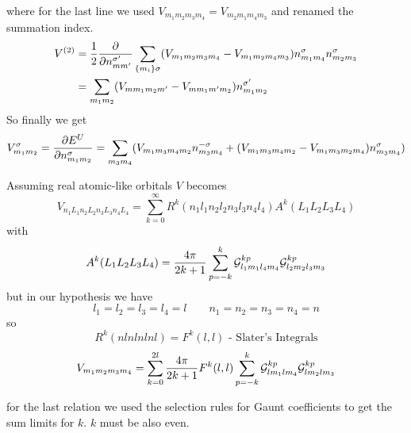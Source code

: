 where for the last line we used $V_{m_1m_2m_3m_4}=V_{m_2m_1m_4m_3}$ and renamed the summation index.\\
\begin{equation}
\begin{split}
V^{(2)}&=\frac{1}{2}\frac{\partial }{\partial n_{mm^\prime}^{\sigma^\prime}}\sum_{\{m_i\}\sigma}(V_{m_1m_2m_3m_4}-V_{m_1m_2m_4m_3})
n_{m_1m_4}^{\sigma}n_{m_2m_3}^{\sigma}\\
&=\sum_{m_1m_2}(V_{mm_1m_2m^{\prime}}-V_{mm_1m^{\prime}m_2})n_{m_1m_2}^{\sigma^\prime}
\end{split}
\end{equation}
So finally we get
\begin{equation}
V_{m_1m_2}^{\sigma}=\frac{\partial E^U}{\partial n_{m_1m_2}^{\sigma}}=\sum_{m_3m_4}(V_{m_1m_3m_4m_2}
n_{m_3m_4}^{-\sigma}+(V_{m_1m_3m_4m_2}-V_{m_1m_3m_2m_4})n_{m_3m_4}^{\sigma})
\end{equation}
%
\par{Assuming real atomic-like orbitals $V$ becomes}
\begin{equation}
V_{n_1L_1n_2L_2n_3L_3n_4L_4}=\sum_{k=0}^{\infty}R^k(n_1l_1n_2l_2n_3l_3n_4l_4)A^k(L_1L_2L_3L_4)
\end{equation}
with
\begin{equation*}
A^k(L_1L_2L_3L_4)=\frac{4\pi}{2k+1}\sum_{p=-k}^{k}\mathcal{G}_{l_1m_1l_4m_4}^{kp}\mathcal{G}_{l_2m_2l_3m_3}^{kp}
\end{equation*}
but in our hypothesis we have
\begin{equation*}
l_1=l_2=l_3=l_4=l\qquad n_1=n_2=n_3=n_4=n
\end{equation*}
so
\begin{equation*}
R^{k}(nlnlnlnl)=F^k(l,l)\text{ - Slater's Integrals}
\end{equation*}
\begin{equation}
V_{m_1m_2m_3m_4}=\sum_{k=0}^{2l}\frac{4\pi}{2k+1}F^k(l,l)\sum_{p=-k}^{k}\mathcal{G}_{lm_1lm_4}^{kp}\mathcal{G}_{lm_2lm_3}^{kp}
\end{equation}
\par{for the last relation we used the selection rules for Gaunt coefficients to get the sum limits for $k$.
$k$ must be also even.}
%
